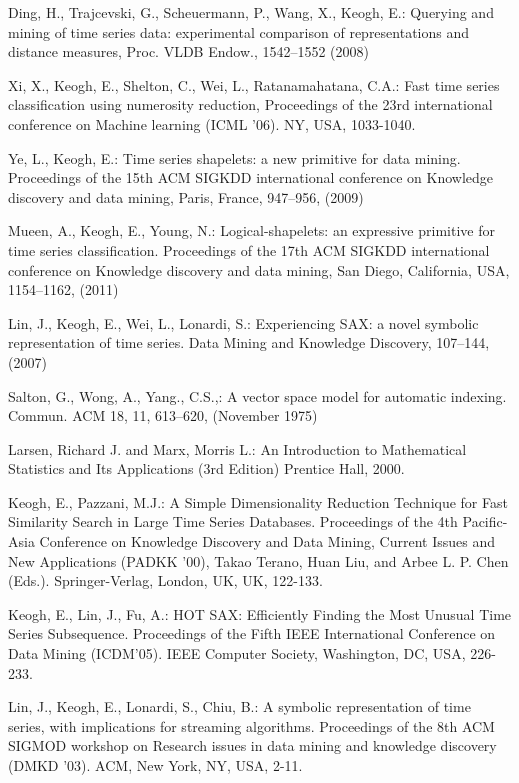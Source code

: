 \documentclass{llncs}
\begin{document}
%
%
\begin{thebibliography}{5}
%

Ding, H., Trajcevski, G., Scheuermann, P., Wang, X., Keogh, E.:
Querying and mining of time series data: experimental comparison of representations and distance measures,
Proc. VLDB Endow., 1542--1552 (2008)

Xi, X., Keogh, E., Shelton, C., Wei, L., Ratanamahatana, C.A.:
Fast time series classification using numerosity reduction,
Proceedings of the 23rd international conference on Machine learning (ICML '06). 
NY, USA, 1033-1040.

Ye, L., Keogh, E.:
Time series shapelets: a new primitive for data mining.
Proceedings of the 15th ACM SIGKDD international conference on Knowledge discovery and data mining,
Paris, France, 947--956, (2009)

Mueen, A., Keogh, E., Young, N.:
Logical-shapelets: an expressive primitive for time series classification.
Proceedings of the 17th ACM SIGKDD international conference on Knowledge discovery and data mining,
San Diego, California, USA, 1154--1162, (2011)

Lin, J., Keogh, E., Wei, L., Lonardi, S.:
Experiencing SAX: a novel symbolic representation of time series.
Data Mining and Knowledge Discovery, 107--144, (2007)

Salton, G., Wong, A., Yang., C.S.,:
A vector space model for automatic indexing. 
Commun. ACM 18, 11, 613--620, (November 1975)

Larsen, Richard J. and Marx, Morris L.:
An Introduction to Mathematical Statistics and Its Applications (3rd Edition)
Prentice Hall, 2000.

Keogh, E., Pazzani, M.J.:
A Simple Dimensionality Reduction Technique for Fast Similarity Search in Large Time Series Databases. 
Proceedings of the 4th Pacific-Asia Conference on Knowledge Discovery and Data Mining, Current Issues and New Applications (PADKK '00), 
Takao Terano, Huan Liu, and Arbee L. P. Chen (Eds.). Springer-Verlag, London, UK, UK, 122-133.

Keogh, E., Lin, J., Fu, A.:
HOT SAX: Efficiently Finding the Most Unusual Time Series Subsequence. 
Proceedings of the Fifth IEEE International Conference on Data Mining (ICDM'05). 
IEEE Computer Society, Washington, DC, USA, 226-233.

Lin, J., Keogh, E., Lonardi, S., Chiu, B.:
A symbolic representation of time series, with implications for streaming algorithms. 
Proceedings of the 8th ACM SIGMOD workshop on Research issues in data mining and knowledge discovery (DMKD '03).
ACM, New York, NY, USA, 2-11.


\end{thebibliography}
\end{document}
